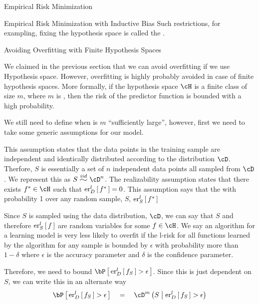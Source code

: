 \documentclass[11pt,a4paper]{article}
\begin{document}
\begin{ssection}{Empirical Risk Minimization}
\begin{ssubsection}{Empirical Risk Minimization with Inductive Bias}
		Such restrictions, for exampling, fixing the hypothesis space is called the .

	\end{ssubsection}

	\begin{ssubsection}{Avoiding Overfitting with Finite Hypothesis Spaces}

		We claimed in the previous section that we can avoid overfitting if we use Hypothesis space. However, overfitting is highly probably avoided in case of finite hypothesis spaces. More formally, if the hypothesis space $\cH$ is a finite class of size $m$, where $m$ is , then the risk of the predictor function is bounded with a high probability.


		We still need to define when is $m$ ``sufficiently large'', however, first we need to take some generic assumptions for our model.

		\begin{enumerate}[label=\bt{\theenumi.}]
			 This assumption states that the data points in the training sample are independent and identically distributed according to the distribution $\cD$. Therfore, $S$ is essentially a set of $n$ independent data points all sampled from $\cD$. We represent this as $S \iid \cD^n$.
			 The realizability assumption states that there exists $f^\ast \in \cH$ such that $\err[_D^l]{f^\ast} = 0$. This assumption says that the with probability 1 over any random sample, $S$, $\err[_S^l]{f^\ast}$
		\end{enumerate}

		Since $S$ is sampled using the data distribution, $\cD$, we can say that $S$ and therefore $\err[_S^l]{f}$ are random variables for some $f \in \cH$. We say an algorithm for a learning model is very less likely to overfit if the l-risk for all functions learned by the algorithm for any sample is bounded by $\epsilon$ with probability more than $1 - \delta$ where $\epsilon$ is the accuracy parameter and $\delta$ is the confidence parameter.

		Therefore, we need to bound $\prob{\err[_D^l]{f_S} > \epsilon}$. Since this is just dependent on $S$, we can write this in an alternate way
		\begin{align*}
			\prob{\err[_D^l]{f_S} > \epsilon}	\eq	\cD^m \para{S \pipe \err[_D^l]{f_S} > \epsilon}
		\end{align*} \sbr


\end{ssubsection}
\end{ssection}
\end{document}
